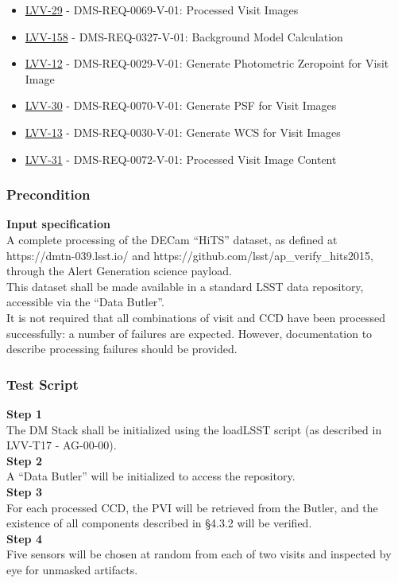 \begin{itemize}
\tightlist
\item
  \href{https://jira.lsstcorp.org/browse/LVV-29}{LVV-29} -
  DMS-REQ-0069-V-01: Processed Visit Images
\item
  \href{https://jira.lsstcorp.org/browse/LVV-158}{LVV-158} -
  DMS-REQ-0327-V-01: Background Model Calculation
\item
  \href{https://jira.lsstcorp.org/browse/LVV-12}{LVV-12} -
  DMS-REQ-0029-V-01: Generate Photometric Zeropoint for Visit Image
\item
  \href{https://jira.lsstcorp.org/browse/LVV-30}{LVV-30} -
  DMS-REQ-0070-V-01: Generate PSF for Visit Images
\item
  \href{https://jira.lsstcorp.org/browse/LVV-13}{LVV-13} -
  DMS-REQ-0030-V-01: Generate WCS for Visit Images
\item
  \href{https://jira.lsstcorp.org/browse/LVV-31}{LVV-31} -
  DMS-REQ-0072-V-01: Processed Visit Image Content
\end{itemize}

\subsubsection{Precondition}\label{precondition-2}

\textbf{Input specification}\\[2\baselineskip]A complete processing of
the DECam ``HiTS'' dataset, as defined at https://dmtn-039.lsst.io/ and
https://github.com/lsst/ap\_verify\_hits2015, through the Alert
Generation science payload.\\
This dataset shall be made available in a standard LSST data repository,
accessible via the ``Data Butler''.\\
It is not required that all combinations of visit and CCD have been
processed successfully: a number of failures are expected. However,
documentation to describe processing failures should be provided.

\subsubsection{Test Script}\label{test-script-2}

\textbf{Step 1}\\
The DM Stack shall be initialized using the loadLSST script (as
described in LVV-T17 - AG-00-00).\\[2\baselineskip]\textbf{Step 2}\\
A ``Data Butler'' will be initialized to access the
repository.\\[2\baselineskip]\textbf{Step 3}\\
For each processed CCD, the PVI will be retrieved from the Butler, and
the existence of all components described in §4.3.2 will be
verified.\\[2\baselineskip]\textbf{Step 4}\\
Five sensors will be chosen at random from each of two visits and
inspected by eye for unmasked artifacts.\\[2\baselineskip]


